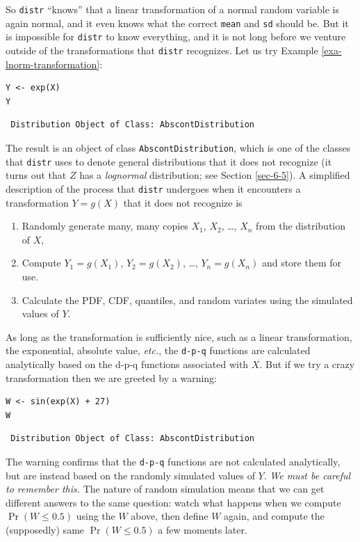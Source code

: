 \documentclass[captions=tableheading]{scrbook}
\begin{document}
So \texttt{distr} ``knows'' that a linear transformation of a normal random variable is again normal, and it even knows what the correct \texttt{mean} and \texttt{sd} should be. But it is impossible for \texttt{distr} to know everything, and it is not long before we venture outside of the transformations that \texttt{distr} recognizes. Let us try Example \ref{exa-lnorm-transformation}:


\begin{verbatim}
Y <- exp(X)
Y
\end{verbatim}

\begin{verbatim}
 Distribution Object of Class: AbscontDistribution
\end{verbatim}

The result is an object of class \texttt{AbscontDistribution}, which is one of the classes that \texttt{distr} uses to denote general distributions that it does not recognize (it turns out that \(Z\) has a \emph{lognormal} distribution; see Section \ref{sec-6-5}). A simplified description of the process that \texttt{distr} undergoes when it encounters a transformation \(Y=g(X)\) that it does not recognize is
\begin{enumerate}
\item Randomly generate many, many copies \(X_{1}\), \(X_{2}\), \ldots{}, \(X_{n}\) from the distribution of \(X\),
\item Compute \(Y_{1}=g(X_{1})\), \(Y_{2}=g(X_{2})\), \ldots{}, \(Y_{n}=g(X_{n})\) and store them for use.
\item Calculate the PDF, CDF, quantiles, and random variates using the simulated values of \(Y\).
\end{enumerate}
As long as the transformation is sufficiently nice, such as a linear transformation, the exponential, absolute value, \emph{etc.}, the \texttt{d-p-q} functions are calculated analytically based on the d-p-q functions associated with \(X\). But if we try a crazy transformation then we are greeted by a warning:


\begin{verbatim}
W <- sin(exp(X) + 27)
W
\end{verbatim}

\begin{verbatim}
 Distribution Object of Class: AbscontDistribution
\end{verbatim}

The warning confirms that the \texttt{d-p-q} functions are not calculated analytically, but are instead based on the randomly simulated values of \(Y\). \emph{We must be careful to remember this.} The nature of random simulation means that we can get different answers to the same question: watch what happens when we compute \(\Pr(W\leq0.5)\) using the \(W\) above, then define \(W\) again, and compute the (supposedly) same \(\Pr(W\leq0.5)\) a few moments later.
\end{document}
